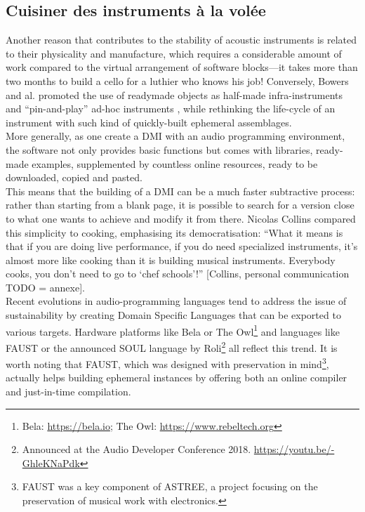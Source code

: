 
\subsection{Cuisiner des instruments à la volée}
Another reason that contributes to the stability of acoustic instruments is related to their physicality and manufacture, which requires a considerable amount of work compared to the virtual arrangement of software blocks—it takes more than two months to build a cello for a luthier who knows his job! Conversely, Bowers and al. promoted the use of readymade objects as half-made infra-instruments \cite{bowers_not_2005} and “pin-and-play” ad-hoc instruments \cite{bowers_creating_2006}, while rethinking the life-cycle of an instrument with such kind of quickly-built ephemeral assemblages.\\
\indent More generally, as one create a DMI with an audio programming environment, the software not only provides basic functions but comes with libraries, ready-made examples, supplemented by countless online resources, ready to be downloaded, copied and pasted.\\
\indent This means that the building of a DMI can be a much faster subtractive process: rather than starting from a blank page, it is possible to search for a version close to what one wants to achieve and modify it from there. Nicolas Collins compared this simplicity to cooking, emphasising its democratisation: “What it means is that if you are doing live performance, if you do need specialized instruments, it's almost more like cooking than it is building musical instruments. Everybody cooks, you don't need to go to ‘chef schools’!” [Collins, personal communication TODO = annexe].\\
\indent Recent evolutions in audio-programming languages tend to address the issue of sustainability by creating Domain Specific Languages that can be exported to various targets. Hardware platforms like Bela or The Owl\footnote{Bela: \url{https://bela.io}; The Owl: \url{https://www.rebeltech.org}} and languages like FAUST \cite{orlarey_faust_2008} or the announced SOUL language by Roli\footnote{Announced at the Audio Developer Conference 2018. \url{https://youtu.be/-GhleKNaPdk}} all reflect this trend. It is worth noting that FAUST, which was designed with preservation in mind\footnote{FAUST was a key component of ASTREE, a project focusing on the preservation of musical work with electronics.}, actually helps building ephemeral instances by offering both an online compiler and just-in-time compilation.
	
